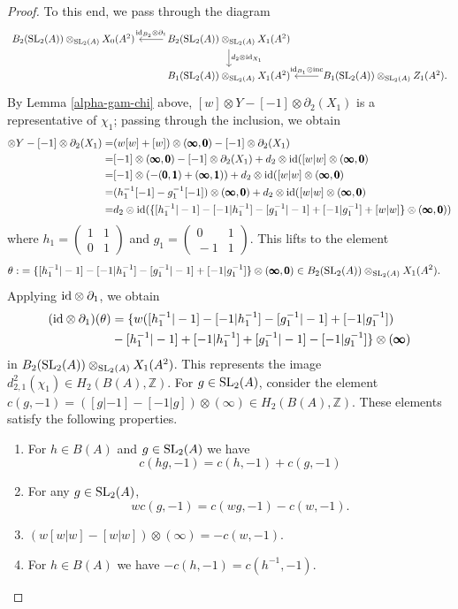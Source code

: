 \documentclass[11pt]{amsart}
\theoremstyle{definition}
\theoremstyle{plain}
\theoremstyle{definition}
\numberwithin{equation}{section}
\newcommand{\z}{\mathbb{Z}}
\newcommand{\SL}{\mathit{{\rm SL}}}
\newcommand{\id}{{\rm id}}
\newcommand{\inc}{{\rm inc}}
\newcommand{\mtxx}[4]
{\left(\!\!
	\begin{array}{cc}
		\!\!#1 & \!\!#2\\
		\!\!#3 & \!\!#4
	\end{array}\!\!
	\right)}
\begin{document}
	\begin{proof}
		To this end, we pass through the diagram
		\[
		\begin{tikzcd}
			B_2(\SL_2(A))\otimes_{\SL_2(A)} X_0(A^ 2) & B_2(\SL_2(A))\otimes_{\SL_2(A)} X_1(A^2) 
			\ar["\id_{B_2}\otimes \partial_1"',  l] \ar[d, "d_2\otimes \id_{X_1}"] & \\
			& B_1(\SL_2(A))\otimes_{\SL_2(A)} X_1(A^ 2) & B_1(\SL_2(A))\otimes_{\SL_2(A)} 
			Z_1(A^2).\ar[l, "\id_{B_1}\otimes \inc"']
		\end{tikzcd}
		\]
		By Lemma \ref{alpha-gam-chi} above, $[w]\otimes Y-[-1]\otimes\partial_2(X_1)$ is a representative of $\chi_1$; passing through the inclusion, we obtain
		\begin{align*}
			[w]\otimes Y-[-1]\otimes\partial_2(X_1)=& (w[w]+[w])\otimes (\pmb{\infty},\pmb{0})-[-1]\otimes\partial_2(X_1)\\
			=&[-1]\otimes(\pmb{\infty},\pmb{0})-[-1]\otimes\partial_2(X_1)+d_2\otimes\id([w|w]\otimes(\pmb{\infty},\pmb{0})\\
			=&[-1]\otimes(-(\pmb{0},\pmb{1})+(\pmb{\infty},\pmb{1}))+d_2\otimes\id([w|w]\otimes(\pmb{\infty},\pmb{0})\\
			=&(h_1^{-1}[-1]-g_1^{-1}[-1])\otimes(\pmb{\infty},\pmb{0})+d_2\otimes\id([w|w]\otimes(\pmb{\infty},\pmb{0})\\
			=&d_2\otimes\id(\{[h^{-1}_1|-1]-[-1|h^{-1}_1]-[g^{-1}_1|-1]+[-1|g^{-1}_1]+[w|w]\}\otimes(\pmb{\infty},\pmb{0}))\\
		\end{align*}
		where $h_1=\mtxx{1}{1}{0}{1}$ and $g_1=\mtxx{0}{1}{-1}{1}$. This lifts to the element
		\begin{align*}
			\theta:&=\{[h^{-1}_1|-1]-[-1|h^{-1}_1]-[g^{-1}_1|-1]+[-1|g^{-1}_1]\}\otimes(\pmb{\infty},\pmb{0})
			\in B_2(\SL_2(A))\otimes_{\SL_2(A)} X_1(A^2).
		\end{align*}
		Applying $\id\otimes\partial_1$, we obtain
		\begin{align*}
			(\id\otimes\partial_1)(\theta)&=\{w([h^{-1}_1|-1]-[-1|h^{-1}_1]-[g^{-1}_1|-1]+[-1|g^{-1}_1])\\
			&-[h^{-1}_1|-1]+[-1|h^{-1}_1]+[g^{-1}_1|-1]-[-1|g^{-1}_1]\}\otimes(\pmb{\infty})
		\end{align*}
		in $B_2(\SL_2(A))\otimes_{\SL_2(A)} X_1(A^2)$. This represents the image $d^2_{2,1}(\chi_1)\in H_2(B(A),\z)$. For $g\in\SL_2(A)$, consider the element $c(g,-1)=([g|-1]-[-1|g])\otimes(\pmb{\infty})\in H_2(B(A),\z)$. These elements satisfy the following properties.
		\begin{enumerate}
			\item For $h\in B(A)$ and $g\in\SL_2(A)$ we have
			\[
			c(hg,-1)=c(h,-1)+c(g,-1)
			\]
			\item For any $g\in\SL_2(A)$,
			\[
			wc(g,-1)=c(wg,-1)-c(w,-1).
			\]
			\item $(w[w|w]-[w|w])\otimes(\pmb{\infty})=-c(w,-1)$.
			\item For $h\in B(A)$ we have $-c(h,-1)=c(h^{-1},-1)$.
		\end{enumerate}
		

\end{proof}
\end{document}
